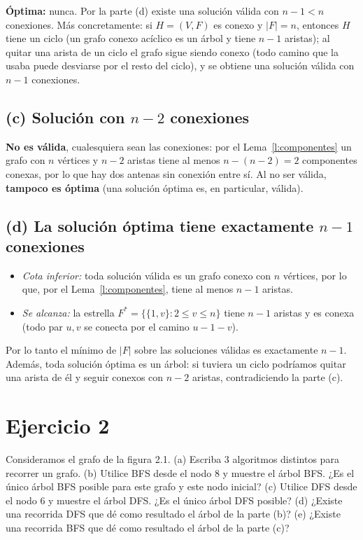 \textbf{Óptima:} nunca. Por la parte (d) existe una solución válida con $n-1<n$ conexiones. Más
concretamente: si $H=(V,F)$ es conexo y $|F|=n$, entonces $H$ tiene un ciclo (un grafo conexo
acíclico es un árbol y tiene $n-1$ aristas); al quitar una arista de un ciclo el grafo sigue siendo
conexo (todo camino que la usaba puede desviarse por el resto del ciclo), y se obtiene una
solución válida con $n-1$ conexiones.

\subsection*{(c) Solución con $n-2$ conexiones}
\textbf{No es válida}, cualesquiera sean las conexiones: por el Lema~\ref{l:componentes} un grafo con
$n$ vértices y $n-2$ aristas tiene al menos $n-(n-2)=2$ componentes conexas, por lo que hay dos
antenas sin conexión entre sí. Al no ser válida, \textbf{tampoco es óptima} (una solución óptima es,
en particular, válida).

\subsection*{(d) La solución óptima tiene exactamente $n-1$ conexiones}
\begin{itemize}
  \item \emph{Cota inferior:} toda solución válida es un grafo conexo con $n$ vértices, por lo que,
  por el Lema~\ref{l:componentes}, tiene al menos $n-1$ aristas.
  \item \emph{Se alcanza:} la estrella $F^*=\{\{1,v\}: 2\le v\le n\}$ tiene $n-1$ aristas y es conexa
  (todo par $u,v$ se conecta por el camino $u-1-v$).
\end{itemize}
Por lo tanto el mínimo de $|F|$ sobre las soluciones válidas es exactamente $n-1$. Además, toda
solución óptima es un árbol: si tuviera un ciclo podríamos quitar una arista de él y seguir conexos
con $n-2$ aristas, contradiciendo la parte (c).

\section{Ejercicio 2}
\begin{enunciado}
Consideramos el grafo de la figura 2.1.
(a) Escriba 3 algoritmos distintos para recorrer un grafo.
(b) Utilice BFS desde el nodo 8 y muestre el árbol BFS. ¿Es el único árbol BFS posible para este grafo y este nodo inicial?
(c) Utilice DFS desde el nodo 6 y muestre el árbol DFS. ¿Es el único árbol DFS posible?
(d) ¿Existe una recorrida DFS que dé como resultado el árbol de la parte (b)?
(e) ¿Existe una recorrida BFS que dé como resultado el árbol de la parte (c)?
\end{enunciado}

